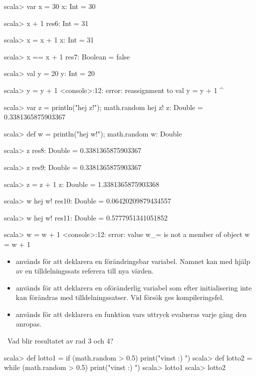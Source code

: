 \SubtaskSolved
\begin{REPL}
  scala> var x = 30
  x: Int = 30

  scala> x + 1
  res6: Int = 31

  scala> x = x + 1
  x: Int = 31

  scala> x == x + 1
  res7: Boolean = false

  scala> val y = 20
  y: Int = 20

  scala> y = y + 1
  <console>:12: error: reassignment to val
         y = y + 1
           ^

  scala> var z = { println("hej z!"); math.random }
  hej z!
  z: Double = 0.3381365875903367

  scala> def w = { println("hej w!"); math.random }
  w: Double

  scala> z
  res8: Double = 0.3381365875903367

  scala> z
  res9: Double = 0.3381365875903367

  scala> z = z + 1
  z: Double = 1.3381365875903368

  scala> w
  hej w!
  res10: Double = 0.06420209879434557

  scala> w
  hej w!
  res11: Double = 0.5777951341051852

  scala> w = w + 1
  <console>:12: error: value w_= is not a member of object
         w = w + 1
\end{REPL}


\SubtaskSolved
\begin{itemize}
\item {} används för att deklarera en förändringsbar variabel. Namnet kan med hjälp av en tilldelningssats referera till nya värden.

\item {} används för att deklarera en oföränderlig variabel som efter initialisering inte kan förändras med tilldelningssatser. Vid försök ges kompileringsfel.
\item {} används för att deklarera en funktion vars uttryck evalueras varje gång den anropas.
\end{itemize}

\QUESTEND





\QUESTBEGIN

\Task \what~Vad blir resultatet av rad 3 och 4?

\begin{REPL}
scala> def lotto1 = if (math.random > 0.5) print("vinst :) ")
scala> def lotto2 = while (math.random > 0.5) print("vinst :) ")
scala> lotto1
scala> lotto2
\end{REPL}

